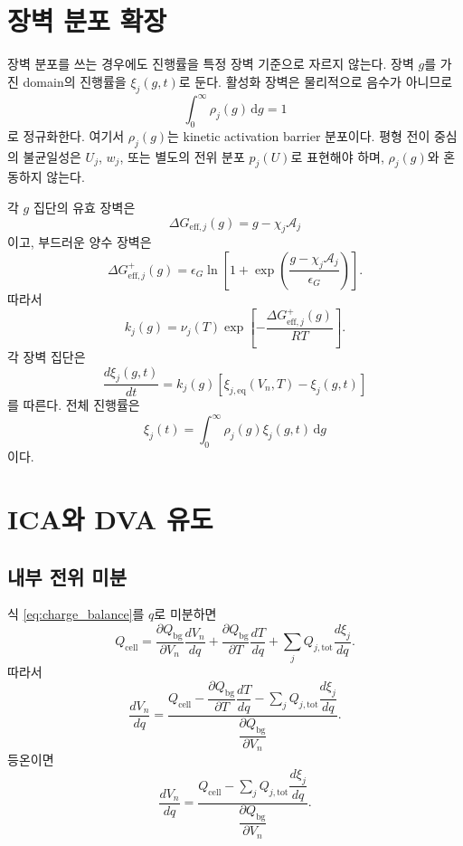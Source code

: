 \documentclass[11pt,a4paper]{article}
\newcommand{\dd}{\mathrm{d}}
\newcommand{\bg}{\mathrm{bg}}
\newcommand{\cell}{\mathrm{cell}}
\newcommand{\tot}{\mathrm{tot}}
\newcommand{\eff}{\mathrm{eff}}
\begin{document}
\section{장벽 분포 확장}
장벽 분포를 쓰는 경우에도 진행률을 특정 장벽 기준으로 자르지 않는다. 장벽 \(g\)를 가진 domain의 진행률을 \(\xi_j(g,t)\)로 둔다. 활성화 장벽은 물리적으로 음수가 아니므로
\begin{equation}
\int_0^{\infty}\rho_j(g)\,\dd g=1
\label{eq:rho_support}
\end{equation}
로 정규화한다. 여기서 \(\rho_j(g)\)는 kinetic activation barrier 분포이다. 평형 전이 중심의 불균일성은 \(U_j\), \(w_j\), 또는 별도의 전위 분포 \(p_j(U)\)로 표현해야 하며, \(\rho_j(g)\)와 혼동하지 않는다.

각 \(g\) 집단의 유효 장벽은
\begin{equation}
\Delta G_{\eff,j}(g)=g-\chi_j\mathcal A_j
\end{equation}
이고, 부드러운 양수 장벽은
\begin{equation}
\Delta G_{\eff,j}^{+}(g)=\epsilon_G\ln\left[1+\exp\left(\frac{g-\chi_j\mathcal A_j}{\epsilon_G}\right)\right].
\end{equation}
따라서
\begin{equation}
k_j(g)=\nu_j(T)\exp\left[-\frac{\Delta G_{\eff,j}^{+}(g)}{RT}\right].
\end{equation}
각 장벽 집단은
\begin{equation}
\frac{d\xi_j(g,t)}{dt}=k_j(g)\left[\xi_{j,\mathrm{eq}}(V_n,T)-\xi_j(g,t)\right]
\end{equation}
를 따른다. 전체 진행률은
\begin{equation}
\boxed{
\xi_j(t)=\int_0^{\infty}\rho_j(g)\xi_j(g,t)\,\dd g
}
\label{eq:xi_distribution}
\end{equation}
이다.

\section{ICA와 DVA 유도}
\subsection{내부 전위 미분}
식 \eqref{eq:charge_balance}를 \(q\)로 미분하면
\begin{equation}
Q_{\cell}=\frac{\partial Q_{\bg}}{\partial V_n}\frac{dV_n}{dq}+\frac{\partial Q_{\bg}}{\partial T}\frac{dT}{dq}+\sum_jQ_{j,\tot}\frac{d\xi_j}{dq}.
\end{equation}
따라서
\begin{equation}
\frac{dV_n}{dq}=\frac{Q_{\cell}-\dfrac{\partial Q_{\bg}}{\partial T}\dfrac{dT}{dq}-\sum_jQ_{j,\tot}\dfrac{d\xi_j}{dq}}{\dfrac{\partial Q_{\bg}}{\partial V_n}}.
\label{eq:dVdq_general}
\end{equation}
등온이면
\begin{equation}
\frac{dV_n}{dq}=\frac{Q_{\cell}-\sum_jQ_{j,\tot}\dfrac{d\xi_j}{dq}}{\dfrac{\partial Q_{\bg}}{\partial V_n}}.
\label{eq:dVdq_iso}
\end{equation}
\end{document}
